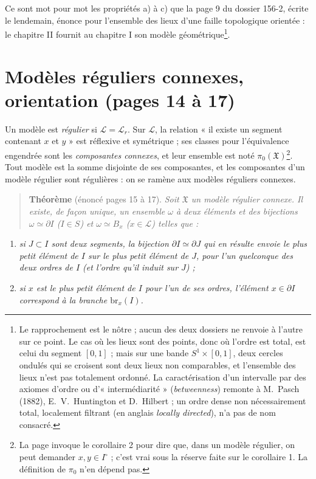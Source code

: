 \documentclass[11pt,a4paper]{article}
\begin{document}
Ce sont mot pour mot les propriétés a) à c) que la page 9 du dossier 156-2,
écrite le lendemain, énonce pour l'ensemble des lieux d'une faille
topologique orientée : le chapitre II fournit au chapitre I son modèle
géométrique\footnote{Le rapprochement est le nôtre ; aucun des deux dossiers
ne renvoie à l'autre sur ce point. Le cas où les lieux sont des points, donc
où l'ordre est total, est celui du segment $[0,1]$ ; mais sur une bande
$S^{1} \times [0,1]$, deux cercles ondulés qui se croisent sont deux lieux
non comparables, et l'ensemble des lieux n'est pas totalement ordonné. La
caractérisation d'un intervalle par des axiomes d'ordre ou
d'« intermédiarité » (\emph{betweenness}) remonte à M.~Pasch (1882),
E.~V.~Huntington et D.~Hilbert ; un ordre dense non nécessairement total,
localement filtrant (en anglais \emph{locally directed}), n'a pas de nom
consacré.}.

\section*{Modèles réguliers connexes, orientation (pages 14 à 17)}

Un modèle est \emph{régulier} si $\mathcal{L} = \mathcal{L}_{r}$. Sur
$\mathcal{L}$, la relation « il existe un segment contenant $x$ et $y$ » est
réflexive et symétrique ; ses classes pour l'équivalence engendrée sont les
\emph{composantes connexes}, et leur ensemble est noté
$\pi_{0}(\mathfrak{X})$\footnote{La page invoque le corollaire 2 pour dire
que, dans un modèle régulier, on peut demander $x, y \in I^{\circ}$ ; c'est
vrai sous la réserve faite sur le corollaire 1. La définition de
$\pi_{0}$ n'en dépend pas.}. Tout modèle est la somme disjointe de ses
composantes, et les composantes d'un modèle régulier sont régulières : on se
ramène aux modèles réguliers connexes.

\begin{quote}
\textbf{Théorème} (énoncé pages 15 à 17). \emph{Soit $\mathfrak{X}$ un modèle
régulier connexe. Il existe, de façon unique, un ensemble $\omega$ à deux
éléments et des bijections $\omega \simeq \partial I$ ($I \in S$) et $\omega
\simeq B_{x}$ ($x \in \mathcal{L}$) telles que :}
\end{quote}

\begin{enumerate}
\item[a)] \emph{si $J \subset I$ sont deux segments, la bijection $\partial I
\simeq \partial J$ qui en résulte envoie le plus petit élément de $I$ sur le
plus petit élément de $J$, pour l'un quelconque des deux ordres de $I$ (et
l'ordre qu'il induit sur $J$) ;}
\item[b)] \emph{si $x$ est le plus petit élément de $I$ pour l'un de ses
ordres, l'élément $x \in \partial I$ correspond à la branche
$\mathrm{br}_{x}(I)$.}
\end{enumerate}
\end{document}

